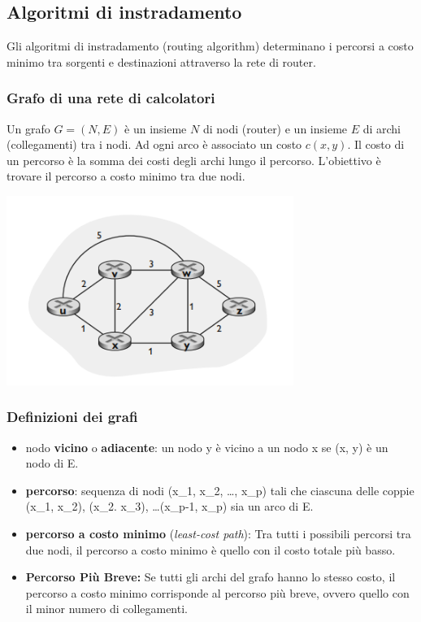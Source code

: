 \subsection{Algoritmi di instradamento}
Gli algoritmi di instradamento (routing algorithm) determinano i percorsi a costo minimo tra sorgenti e destinazioni attraverso la rete di router.

\subsubsection*{Grafo di una rete di calcolatori}
Un grafo \(G = (N, E)\) è un insieme \(N\) di nodi (router) e un insieme \(E\) di archi (collegamenti) tra i nodi. Ad ogni arco è associato un costo \(c(x,y)\). Il costo di un percorso è la somma dei costi degli archi lungo il percorso. L'obiettivo è trovare il percorso a costo minimo tra due nodi.

\begin{center}
  \includegraphics[width=0.7\textwidth]{./img/grafo.png}
\end{center}

\subsubsection*{Definizioni dei grafi}

\begin{itemize}
  \item nodo \textbf{vicino} o \textbf{adiacente}: un nodo y è vicino a un nodo x se (x, y) è un nodo di E. 
  \item \textbf{percorso}: sequenza di nodi (x\_1, x\_2, \dots, x\_p) tali che ciascuna delle coppie (x\_1, x\_2), (x\_2. x\_3), \dots (x\_{p-1}, x\_p) sia un arco di E.
  \item \textbf{percorso a costo minimo} (\textit{least-cost path}): Tra tutti i possibili percorsi tra due nodi, il percorso a costo minimo è quello con il costo totale più basso. 
  \item \textbf{Percorso Più Breve:} Se tutti gli archi del grafo hanno lo stesso costo, il percorso a costo minimo corrisponde al percorso più breve, ovvero quello con il minor numero di collegamenti. 
\end{itemize}


